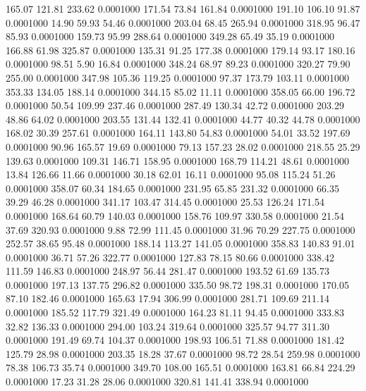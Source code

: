  165.07  121.81  233.62   0.0001000
 171.54   73.84  161.84   0.0001000
 191.10  106.10   91.87   0.0001000
  14.90   59.93   54.46   0.0001000
 203.04   68.45  265.94   0.0001000
 318.95   96.47   85.93   0.0001000
 159.73   95.99  288.64   0.0001000
 349.28   65.49   35.19   0.0001000
 166.88   61.98  325.87   0.0001000
 135.31   91.25  177.38   0.0001000
 179.14   93.17  180.16   0.0001000
  98.51    5.90   16.84   0.0001000
 348.24   68.97   89.23   0.0001000
 320.27   79.90  255.00   0.0001000
 347.98  105.36  119.25   0.0001000
  97.37  173.79  103.11   0.0001000
 353.33  134.05  188.14   0.0001000
 344.15   85.02   11.11   0.0001000
 358.05   66.00  196.72   0.0001000
  50.54  109.99  237.46   0.0001000
 287.49  130.34   42.72   0.0001000
 203.29   48.86   64.02   0.0001000
 203.55  131.44  132.41   0.0001000
  44.77   40.32   44.78   0.0001000
 168.02   30.39  257.61   0.0001000
 164.11  143.80   54.83   0.0001000
  54.01   33.52  197.69   0.0001000
  90.96  165.57   19.69   0.0001000
  79.13  157.23   28.02   0.0001000
 218.55   25.29  139.63   0.0001000
 109.31  146.71  158.95   0.0001000
 168.79  114.21   48.61   0.0001000
  13.84  126.66   11.66   0.0001000
  30.18   62.01   16.11   0.0001000
  95.08  115.24   51.26   0.0001000
 358.07   60.34  184.65   0.0001000
 231.95   65.85  231.32   0.0001000
  66.35   39.29   46.28   0.0001000
 341.17  103.47  314.45   0.0001000
  25.53  126.24  171.54   0.0001000
 168.64   60.79  140.03   0.0001000
 158.76  109.97  330.58   0.0001000
  21.54   37.69  320.93   0.0001000
   9.88   72.99  111.45   0.0001000
  31.96   70.29  227.75   0.0001000
 252.57   38.65   95.48   0.0001000
 188.14  113.27  141.05   0.0001000
 358.83  140.83   91.01   0.0001000
  36.71   57.26  322.77   0.0001000
 127.83   78.15   80.66   0.0001000
 338.42  111.59  146.83   0.0001000
 248.97   56.44  281.47   0.0001000
 193.52   61.69  135.73   0.0001000
 197.13  137.75  296.82   0.0001000
 335.50   98.72  198.31   0.0001000
 170.05   87.10  182.46   0.0001000
 165.63   17.94  306.99   0.0001000
 281.71  109.69  211.14   0.0001000
 185.52  117.79  321.49   0.0001000
 164.23   81.11   94.45   0.0001000
 333.83   32.82  136.33   0.0001000
 294.00  103.24  319.64   0.0001000
 325.57   94.77  311.30   0.0001000
 191.49   69.74  104.37   0.0001000
 198.93  106.51   71.88   0.0001000
 181.42  125.79   28.98   0.0001000
 203.35   18.28   37.67   0.0001000
  98.72   28.54  259.98   0.0001000
  78.38  106.73   35.74   0.0001000
 349.70  108.00  165.51   0.0001000
 163.81   66.84  224.29   0.0001000
  17.23   31.28   28.06   0.0001000
 320.81  141.41  338.94   0.0001000
